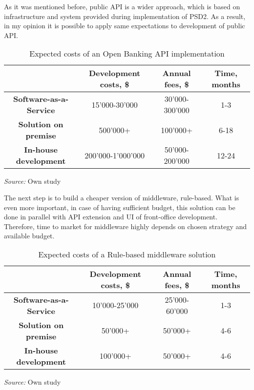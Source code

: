 As it was mentioned before, public API is a wider approach, which is based on infrastructure and system provided during implementation of PSD2.
As a result, in my opinion it is possible to apply same expectations to development of public API.

\begin{table}
    \centering
    \begin{tabular}{| c | c | c | c |}
        \hline
        &
        \textbf{Development costs, \$} & 
        \textbf{Annual fees, \$} &
        \textbf{Time, months} \\ \hline 
       
        \textbf{Software-as-a-Service} & 
            15'000-30'000 & 
            30'000-300'000 &
            1-3 \\ \hline 
       
        \textbf{Solution on premise} & 
            500'000+ &
            100'000+ &
            6-18 \\ \hline 
            
        \textbf{In-house development} &
            200'000-1'000'000 &
            50'000-200'000 &
            12-24 \\ \hline
    \end{tabular}
    \caption{Expected costs of an Open Banking API implementation}
    \medskip
    \footnotesize\textit{Source:} Own study
\end{table}

The next step is to build a cheaper version of middleware, rule-based.
What is even more important, in case of having sufficient budget, this solution can be done in parallel with API extension and UI of front-office development.
Therefore, time to market for middleware highly depends on chosen strategy and available budget.

\begin{table}
    \centering
    \begin{tabular}{| c | c | c | c |}
        \hline
        &
        \textbf{Development costs, \$} & 
        \textbf{Annual fees, \$} &
        \textbf{Time, months} \\ \hline 
       
        \textbf{Software-as-a-Service} & 
            10'000-25'000 & 
            25'000-60'000 &
            1-3 \\ \hline 
       
        \textbf{Solution on premise} & 
            50'000+ &
            50'000+ &
            4-6 \\ \hline 
            
        \textbf{In-house development} &
            100'000+ &
            50'000+ &
            4-6 \\ \hline
    \end{tabular}
    \caption{Expected costs of a Rule-based middleware solution}
    \medskip
    \footnotesize\textit{Source:} Own study
\end{table}

